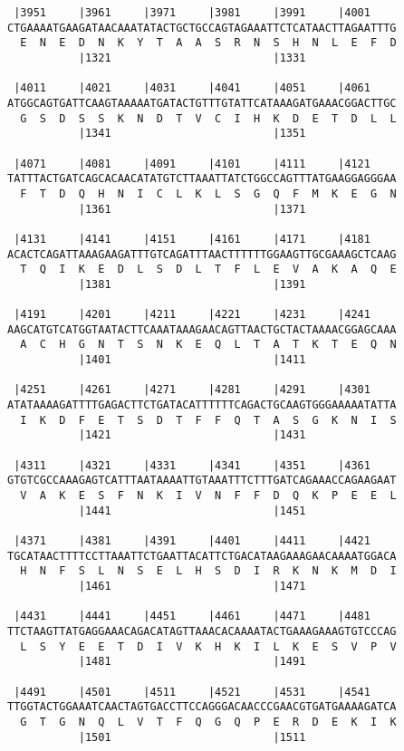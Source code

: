 \documentclass{article}
\begin{document}
\begin{Verbatim}
 |3951     |3961     |3971     |3981     |3991     |4001    
CTGAAAATGAAGATAACAAATATACTGCTGCCAGTAGAAATTCTCATAACTTAGAATTTG
  E  N  E  D  N  K  Y  T  A  A  S  R  N  S  H  N  L  E  F  D
           |1321                         |1331              
  
 |4011     |4021     |4031     |4041     |4051     |4061    
ATGGCAGTGATTCAAGTAAAAATGATACTGTTTGTATTCATAAAGATGAAACGGACTTGC
  G  S  D  S  S  K  N  D  T  V  C  I  H  K  D  E  T  D  L  L
           |1341                         |1351              
  
 |4071     |4081     |4091     |4101     |4111     |4121    
TATTTACTGATCAGCACAACATATGTCTTAAATTATCTGGCCAGTTTATGAAGGAGGGAA
  F  T  D  Q  H  N  I  C  L  K  L  S  G  Q  F  M  K  E  G  N
           |1361                         |1371              
  
 |4131     |4141     |4151     |4161     |4171     |4181    
ACACTCAGATTAAAGAAGATTTGTCAGATTTAACTTTTTTGGAAGTTGCGAAAGCTCAAG
  T  Q  I  K  E  D  L  S  D  L  T  F  L  E  V  A  K  A  Q  E
           |1381                         |1391              
  
 |4191     |4201     |4211     |4221     |4231     |4241    
AAGCATGTCATGGTAATACTTCAAATAAAGAACAGTTAACTGCTACTAAAACGGAGCAAA
  A  C  H  G  N  T  S  N  K  E  Q  L  T  A  T  K  T  E  Q  N
           |1401                         |1411              
  
 |4251     |4261     |4271     |4281     |4291     |4301    
ATATAAAAGATTTTGAGACTTCTGATACATTTTTTCAGACTGCAAGTGGGAAAAATATTA
  I  K  D  F  E  T  S  D  T  F  F  Q  T  A  S  G  K  N  I  S
           |1421                         |1431              
  
 |4311     |4321     |4331     |4341     |4351     |4361    
GTGTCGCCAAAGAGTCATTTAATAAAATTGTAAATTTCTTTGATCAGAAACCAGAAGAAT
  V  A  K  E  S  F  N  K  I  V  N  F  F  D  Q  K  P  E  E  L
           |1441                         |1451              
  
 |4371     |4381     |4391     |4401     |4411     |4421    
TGCATAACTTTTCCTTAAATTCTGAATTACATTCTGACATAAGAAAGAACAAAATGGACA
  H  N  F  S  L  N  S  E  L  H  S  D  I  R  K  N  K  M  D  I
           |1461                         |1471              
  
 |4431     |4441     |4451     |4461     |4471     |4481    
TTCTAAGTTATGAGGAAACAGACATAGTTAAACACAAAATACTGAAAGAAAGTGTCCCAG
  L  S  Y  E  E  T  D  I  V  K  H  K  I  L  K  E  S  V  P  V
           |1481                         |1491              
  
 |4491     |4501     |4511     |4521     |4531     |4541    
TTGGTACTGGAAATCAACTAGTGACCTTCCAGGGACAACCCGAACGTGATGAAAAGATCA
  G  T  G  N  Q  L  V  T  F  Q  G  Q  P  E  R  D  E  K  I  K
           |1501                         |1511              
  

\end{Verbatim}
\end{document}
